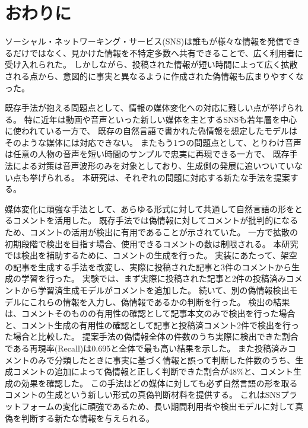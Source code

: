 \chapter{おわりに}\label{ch:conclusion}
ソーシャル・ネットワーキング・サービス(SNS)は誰もが様々な情報を発信できるだけではなく、見かけた情報を不特定多数へ共有できることで、広く利用者に受け入れられた。
しかしながら、投稿された情報が短い時間によって広く拡散される点から、意図的に事実と異なるように作成された偽情報も広まりやすくなった。

既存手法が抱える問題点として、情報の媒体変化への対応に難しい点が挙げられる。
特に近年は動画や音声といった新しい媒体を主とするSNSも若年層を中心に使われている一方で、
既存の自然言語で書かれた偽情報を想定したモデルはそのような媒体には対応できない。
またもう1つの問題点として、とりわけ音声は任意の人物の音声を短い時間のサンプルで忠実に再現できる一方で、
既存手法による対策は音声波形のみを対象としており、生成側の発展に追いついていない点も挙げられる。
本研究は、それぞれの問題に対応する新たな手法を提案する。

媒体変化に頑強な手法として、あらゆる形式に対して共通して自然言語の形をとるコメントを活用した。
既存手法では偽情報に対してコメントが批判的になるため、コメントの活用が検出に有用であることが示されていた。
一方で拡散の初期段階で検出を目指す場合、使用できるコメントの数は制限される。
本研究では検出を補助するために、コメントの生成を行った。
実装にあたって、架空の記事を生成する手法を改変し、実際に投稿された記事と3件のコメントから生成の学習を行った。
実験では、まず実際に投稿された記事と2件の投稿済みコメントから学習済生成モデルがコメントを追加した。
続いて、別の偽情報検出モデルにこれらの情報を入力し、偽情報であるかの判断を行った。
検出の結果は、コメントそのものの有用性の確認として記事本文のみで検出を行った場合と、コメント生成の有用性の確認として記事と投稿済コメント2件で検出を行った場合と比較した。
提案手法の偽情報全体の件数のうち実際に検出できた割合である再現率(Recall)は0.695と全体で最も高い結果を示した。
また投稿済みコメントのみで分類したときに事実に基づく情報と誤って判断した件数のうち、生成コメントの追加によって偽情報と正しく判断できた割合が48\%と、コメント生成の効果を確認した。
この手法はどの媒体に対しても必ず自然言語の形を取るコメントの生成という新しい形式の真偽判断材料を提供する。
これはSNSプラットフォームの変化に頑強であるため、長い期間利用者や検出モデルに対して真偽を判断する新たな情報を与えられる。

